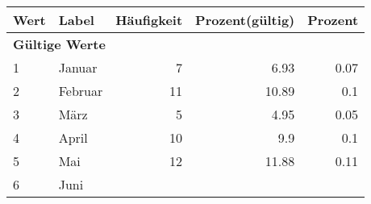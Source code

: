      \begin{longtable}{lXrrr}
     \toprule
     \textbf{Wert} & \textbf{Label} & \textbf{Häufigkeit} & \textbf{Prozent(gültig)} & \textbf{Prozent} \\
     \endhead
     \midrule
     \multicolumn{5}{l}{\textbf{Gültige Werte}}\\

     1 &
     \multicolumn{1}{X}{ Januar   } &


       \num{7} &
       \num[round-mode=places,round-precision=2]{6,93} &
         \num[round-mode=places,round-precision=2]{0,07} \\

     2 &
     \multicolumn{1}{X}{ Februar   } &


       \num{11} &
       \num[round-mode=places,round-precision=2]{10,89} &
         \num[round-mode=places,round-precision=2]{0,1} \\

     3 &
     \multicolumn{1}{X}{ März   } &


       \num{5} &
       \num[round-mode=places,round-precision=2]{4,95} &
         \num[round-mode=places,round-precision=2]{0,05} \\

     4 &
     \multicolumn{1}{X}{ April   } &


       \num{10} &
       \num[round-mode=places,round-precision=2]{9,9} &
         \num[round-mode=places,round-precision=2]{0,1} \\

     5 &
     \multicolumn{1}{X}{ Mai   } &


       \num{12} &
       \num[round-mode=places,round-precision=2]{11,88} &
         \num[round-mode=places,round-precision=2]{0,11} \\

     6 &
     \multicolumn{1}{X}{ Juni   } &



\end{longtable}
